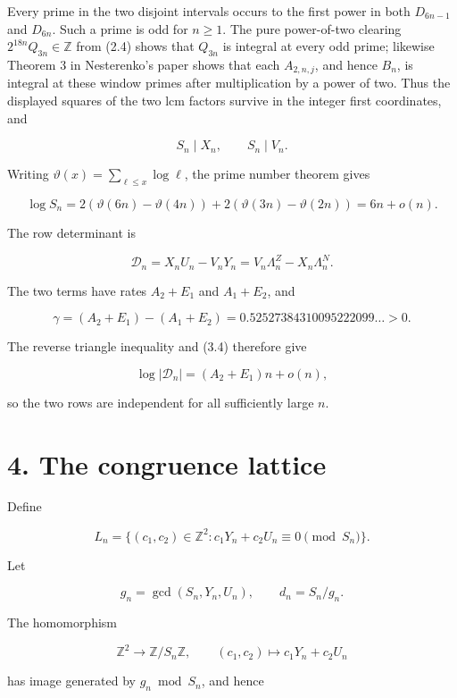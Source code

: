 \documentclass[
  11pt,
]{article}
\begin{document}
Every prime in the two disjoint intervals occurs to the first power in
both \(D_{6n-1}\) and \(D_{6n}\). Such a prime is odd for \(n\ge1\). The
pure power-of-two clearing \(2^{18n}Q_{3n}\in\mathbb Z\) from (2.4)
shows that \(Q_{3n}\) is integral at every odd prime; likewise Theorem 3
in Nesterenko's paper shows that each \(A_{2,n,j}\), and hence \(B_n\),
is integral at these window primes after multiplication by a power of
two. Thus the displayed squares of the two lcm factors survive in the
integer first coordinates, and

\[
 S_n\mid X_n,\qquad S_n\mid V_n.                    \tag{3.7}
\]

Writing \(\vartheta(x)=\sum_{\ell\le x}\log\ell\), the prime number
theorem gives

\[
 \log S_n=
 2(\vartheta(6n)-\vartheta(4n))
 +2(\vartheta(3n)-\vartheta(2n))
 =6n+o(n).                                           \tag{3.8}
\]

The row determinant is

\[
 \mathcal D_n=X_nU_n-V_nY_n
              =V_n\Lambda_n^Z-X_n\Lambda_n^N.       \tag{3.9}
\]

The two terms have rates \(A_2+E_1\) and \(A_1+E_2\), and

\[
 \gamma=(A_2+E_1)-(A_1+E_2)
 =0.52527384310095222099\ldots>0.                   \tag{3.10}
\]

The reverse triangle inequality and (3.4) therefore give

\[
 \log|\mathcal D_n|=(A_2+E_1)n+o(n),                \tag{3.11}
\]

so the two rows are independent for all sufficiently large \(n\).

\hypertarget{the-congruence-lattice}{%
\section{4. The congruence lattice}\label{the-congruence-lattice}}

Define

\[
 L_n=\{(c_1,c_2)\in\mathbb Z^2:
       c_1Y_n+c_2U_n\equiv0\pmod {S_n}\}.            \tag{4.1}
\]

Let

\[
 g_n=\gcd(S_n,Y_n,U_n),\qquad d_n=S_n/g_n.           \tag{4.2}
\]

The homomorphism

\[
 \mathbb Z^2\longrightarrow\mathbb Z/S_n\mathbb Z,\qquad
 (c_1,c_2)\longmapsto c_1Y_n+c_2U_n
\]

has image generated by \(g_n\bmod S_n\), and hence
\end{document}
